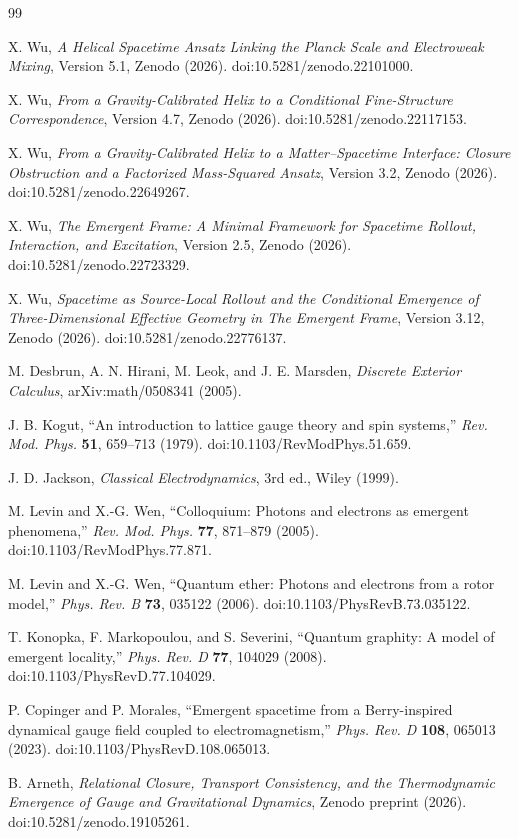 \documentclass[11pt]{article}
\begin{document}
\balance
\begingroup
\small
\raggedright
\begin{thebibliography}{99}

X. Wu,
\emph{A Helical Spacetime Ansatz Linking the Planck Scale and Electroweak Mixing},
Version 5.1, Zenodo (2026).
doi:10.5281/zenodo.22101000.

X. Wu,
\emph{From a Gravity-Calibrated Helix to a Conditional Fine-Structure Correspondence},
Version 4.7, Zenodo (2026).
doi:10.5281/zenodo.22117153.

X. Wu,
\emph{From a Gravity-Calibrated Helix to a Matter--Spacetime Interface: Closure Obstruction and a Factorized Mass-Squared Ansatz},
Version 3.2, Zenodo (2026).
doi:10.5281/zenodo.22649267.

X. Wu,
\emph{The Emergent Frame: A Minimal Framework for Spacetime Rollout, Interaction, and Excitation},
Version 2.5, Zenodo (2026).
doi:10.5281/zenodo.22723329.

X. Wu,
\emph{Spacetime as Source-Local Rollout and the Conditional Emergence of Three-Dimensional Effective Geometry in The Emergent Frame},
Version 3.12, Zenodo (2026).
doi:10.5281/zenodo.22776137.

M. Desbrun, A. N. Hirani, M. Leok, and J. E. Marsden,
\emph{Discrete Exterior Calculus},
arXiv:math/0508341 (2005).

J. B. Kogut,
``An introduction to lattice gauge theory and spin systems,''
\emph{Rev. Mod. Phys.} \textbf{51}, 659--713 (1979).
doi:10.1103/RevModPhys.51.659.

J. D. Jackson,
\emph{Classical Electrodynamics},
3rd ed., Wiley (1999).


M. Levin and X.-G. Wen,
``Colloquium: Photons and electrons as emergent phenomena,''
\emph{Rev. Mod. Phys.} \textbf{77}, 871--879 (2005).
doi:10.1103/RevModPhys.77.871.

M. Levin and X.-G. Wen,
``Quantum ether: Photons and electrons from a rotor model,''
\emph{Phys. Rev. B} \textbf{73}, 035122 (2006).
doi:10.1103/PhysRevB.73.035122.

T. Konopka, F. Markopoulou, and S. Severini,
``Quantum graphity: A model of emergent locality,''
\emph{Phys. Rev. D} \textbf{77}, 104029 (2008).
doi:10.1103/PhysRevD.77.104029.

P. Copinger and P. Morales,
``Emergent spacetime from a Berry-inspired dynamical gauge field coupled to electromagnetism,''
\emph{Phys. Rev. D} \textbf{108}, 065013 (2023).
doi:10.1103/PhysRevD.108.065013.

B. Arneth,
\emph{Relational Closure, Transport Consistency, and the Thermodynamic Emergence of Gauge and Gravitational Dynamics},
Zenodo preprint (2026).
doi:10.5281/zenodo.19105261.

\end{thebibliography}
\endgroup
\end{document}
